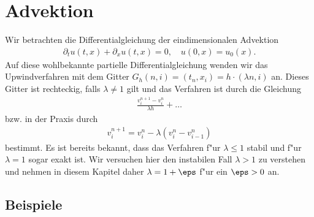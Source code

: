 \section{Advektion}

Wir betrachten die Differentialgleichung der eindimensionalen Advektion
\begin{align}\label{eq:adv:pde}
\partial_t u(t, x) + \partial_x u(t, x) = 0, \quad u(0, x) = u_0(x).
\end{align}
Auf diese wohlbekannte partielle Differentialgleichung wenden wir das Upwindverfahren mit dem Gitter $G_h(n,i) = (t_n, x_i) = h \cdot (\lambda n, i)$ an.
Dieses Gitter ist rechteckig, falls $\lambda \neq 1$ gilt und das Verfahren ist durch die Gleichung
\begin{align}\label{eq:adv:scheme_rechnung}
\frac {v^{n+1}_i - v^n_i} {\lambda h} + \ldots
\end{align}
bzw. in der Praxis durch
\begin{align}\label{eq:adv:scheme}
v^{n+1}_i = v^n_i - \lambda (v^n_i - v^n_{i-1})
\end{align}
bestimmt.
Es ist bereits bekannt, dass das Verfahren f"ur $\lambda \leq 1$ stabil und f"ur $\lambda = 1$ sogar exakt ist.
Wir versuchen hier den instabilen Fall $\lambda > 1$ zu verstehen und nehmen in diesem Kapitel daher $\lambda = 1 + \eps$ f"ur ein $\eps > 0$ an.

\subsection{Beispiele}


